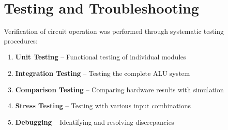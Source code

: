 \section{Testing and Troubleshooting}

Verification of circuit operation was performed through systematic testing procedures:

\begin{enumerate}
    \item \textbf{Unit Testing} -- Functional testing of individual modules
    \item \textbf{Integration Testing} -- Testing the complete ALU system
    \item \textbf{Comparison Testing} -- Comparing hardware results with simulation
    \item \textbf{Stress Testing} -- Testing with various input combinations
    \item \textbf{Debugging} -- Identifying and resolving discrepancies
\end{enumerate}
